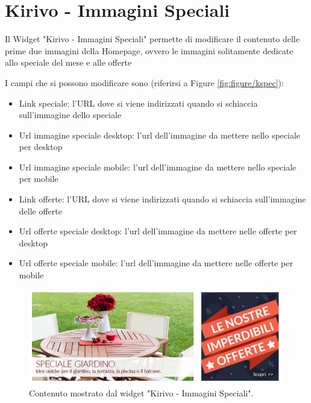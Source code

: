 




\newpage


\section{Kirivo - Immagini Speciali}

Il Widget "Kirivo - Immagini Speciali" permette di modificare il contenuto
delle prime due immagini della Homepage, ovvero le immagini solitamente dedicate
allo speciale del mese e alle offerte 

I campi che si possono modificare sono (riferirsi a Figure \ref{fig:figure/kspec}):
\begin{itemize}
\item Link speciale: l'URL dove si viene indirizzati quando si schiaccia sull'immagine dello speciale
\item Url immagine speciale desktop: l'url dell'immagine da mettere nello speciale per desktop
\item Url immagine speciale mobile: l'url dell'immagine da mettere nello speciale per mobile
\item Link offerte: l'URL dove si viene indirizzati quando si schiaccia sull'immagine delle offerte
\item Url offerte speciale desktop: l'url dell'immagine da mettere nelle offerte per desktop
\item Url offerte speciale mobile: l'url dell'immagine da mettere nelle offerte per mobile
\end{itemize}

\begin{figure}
  \includegraphics[width=\textwidth]{figure/kspec.png}
  \caption{Contenuto mostrato dal widget "Kirivo - Immagini Speciali".}
  \label{fig:kspec}
\end{figure}

